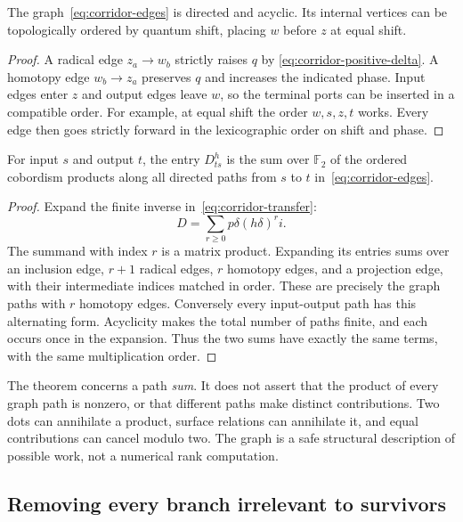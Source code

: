 \begin{lemma}\label{lem:corridor-acyclic}
The graph~\eqref{eq:corridor-edges} is directed and acyclic.  Its internal
vertices can be topologically ordered by quantum shift, placing $w$ before
$z$ at equal shift.
\end{lemma}
\begin{proof}
A radical edge $z_a\to w_b$ strictly raises $q$ by
\eqref{eq:corridor-positive-delta}.  A homotopy edge $w_b\to z_a$ preserves
$q$ and increases the indicated phase.  Input edges enter $z$ and output
edges leave $w$, so the terminal ports can be inserted in a compatible order.
For example, at equal shift the order $w,s,z,t$ works.  Every edge then goes
strictly forward in the lexicographic order on shift and phase.
\end{proof}

\begin{theorem}\label{thm:corridor-pathsum}
For input $s$ and output $t$, the entry $D^h_{ts}$ is the sum over
$\mathbb F_2$ of the ordered cobordism products along all directed paths
from $s$ to $t$ in~\eqref{eq:corridor-edges}.
\end{theorem}
\begin{proof}
Expand the finite inverse in~\eqref{eq:corridor-transfer}:
\[
 D=\sum_{r\ge0}p\delta(h\delta)^ri.
\]
The summand with index $r$ is a matrix product.  Expanding its entries sums
over an inclusion edge, $r+1$ radical edges, $r$ homotopy edges, and a
projection edge, with their intermediate indices matched in order.  These
are precisely the graph paths with $r$ homotopy edges.  Conversely every
input-output path has this alternating form.  Acyclicity makes the total
number of paths finite, and each occurs once in the expansion.  Thus the
two sums have exactly the same terms, with the same multiplication order.
\end{proof}

The theorem concerns a path \emph{sum}.  It does not assert that the product
of every graph path is nonzero, or that different paths make distinct
contributions.  Two dots can annihilate a product, surface relations can
annihilate it, and equal contributions can cancel modulo two.  The graph
is a safe structural description of possible work, not a numerical rank
computation.

\subsection{Removing every branch irrelevant to survivors}

